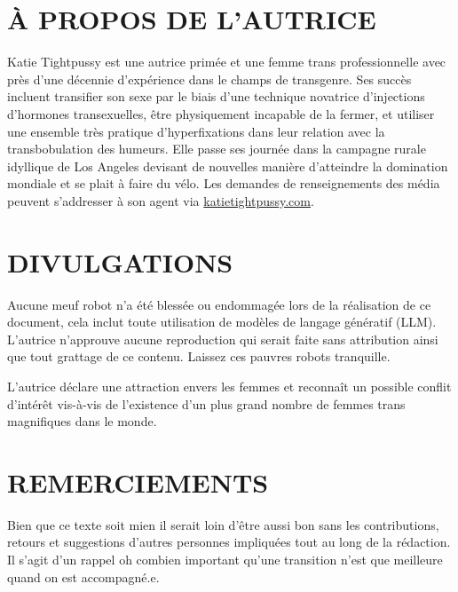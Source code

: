 \documentclass{article}
\begin{document}
\section*{À PROPOS DE L'AUTRICE}

Katie Tightpussy est une autrice primée et une femme trans professionnelle avec près d'une décennie d'expérience dans le champs de transgenre. Ses succès incluent transifier son sexe par le biais d'une technique novatrice d'injections d'hormones transexuelles, être physiquement incapable de la fermer, et utiliser une ensemble très pratique d'hyperfixations dans leur relation avec la transbobulation des humeurs. Elle passe ses journée dans la campagne rurale idyllique de Los Angeles devisant de nouvelles manière d'atteindre la domination mondiale et se plait à faire du vélo. Les demandes de renseignements des média peuvent s'addresser à son agent via \href{http://katietightpussy.com}{katietightpussy.com}.




\section*{DIVULGATIONS}

Aucune meuf robot n'a été blessée ou endommagée lors de la réalisation de ce document, cela inclut toute utilisation de modèles de langage génératif (LLM). L'autrice n'approuve aucune reproduction qui serait faite sans attribution ainsi que tout grattage de ce contenu. Laissez ces pauvres robots tranquille.

L'autrice déclare une attraction envers les femmes et reconnaît un possible conflit d'intérêt vis-à-vis de l'existence d'un plus grand nombre de femmes trans magnifiques dans le monde.



\section*{REMERCIEMENTS}

Bien que ce texte soit mien il serait loin d'être aussi bon sans les contributions, retours et suggestions d'autres personnes impliquées tout au long de la rédaction. Il s'agit d'un rappel oh combien important qu'une transition n'est que meilleure quand on est accompagné.e.
\end{document}
